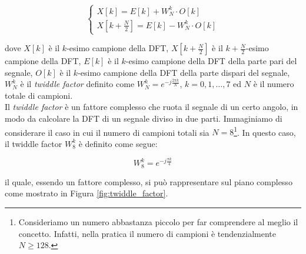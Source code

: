 \documentclass[a4paper,12pt]{report}  %
\begin{document}
\begin{equation}
    \begin{cases}
        X[k] = E[k] + W_N^k \cdot O[k] \\
        X[k + \frac{N}{2}] = E[k] - W_N^k \cdot O[k]
    \end{cases} \nonumber
\end{equation}

dove $X[k]$ è il $k$-esimo campione della DFT, $X[k + \frac{N}{2}]$ è il $k + \frac{N}{2}$-esimo campione della DFT, $E[k]$ è il $k$-esimo campione della DFT della parte pari del segnale, $O[k]$ è il $k$-esimo campione della DFT della parte dispari del segnale, $W_N^k$ è il \textit{twiddle factor} definito come $W_N^k = e^{-j \frac{2 \pi k}{N}}$, $k = 0, 1, \ldots, 7$ ed $N$ è il numero totale di campioni.
\noindent\\ Il \textit{twiddle factor} è un fattore complesso che ruota il segnale di un certo angolo, in modo da calcolare la DFT di un segnale diviso in due parti.
Immaginiamo di considerare il caso in cui il numero di campioni totali sia $N = 8$\footnote{Consideriamo un numero abbastanza piccolo per far comprendere al meglio il concetto. Infatti, nella pratica il numero di campioni è tendenzialmente $N \geq 128$.}.
In questo caso, il twiddle factor $W_8^k$ è definito come segue:

\begin{equation}
    W_8^k = e^{-j \frac{\pi k}{4}} \nonumber
\end{equation}

il quale, essendo un fattore complesso, si può rappresentare sul piano complesso come mostrato in Figura \ref{fig:twiddle_factor}.
\end{document}
